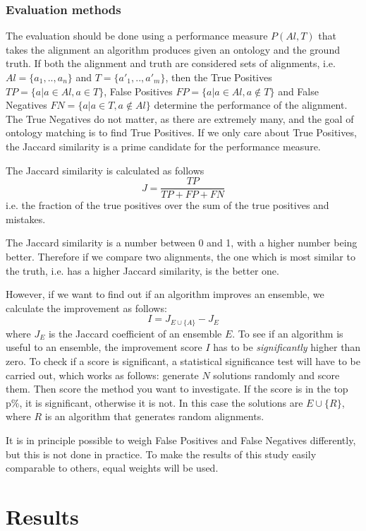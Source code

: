 \documentclass{article}
\begin{document}
 \subsubsection{Evaluation methods} \label{EvaluationMethods}
 The evaluation should be done using a performance measure $P(Al,T)$ that takes the alignment an algorithm produces given an ontology and the ground truth. If both the alignment and truth are considered sets of alignments, i.e. $Al=\{a_1,..,a_n\}$ and $T=\{a'_1,..,a'_m\}$, then the True Positives $TP=\{a|a\in Al, a\in T\}$, False Positives $FP=\{a|a\in Al, a\notin T\}$ and False Negatives $FN=\{a|a\in T, a\notin Al\}$ determine the performance of the alignment. The True Negatives do not matter, as there are extremely many, and the goal of ontology matching is to find True Positives. If we only care about True Positives, the Jaccard similarity is a prime candidate for the performance measure.
 
 The Jaccard similarity is calculated as follows
 \[
 J = \frac{TP}{TP + FP + FN}
 \]
 i.e. the fraction of the true positives over the sum of the true positives and mistakes.
 
 The Jaccard similarity is a number between 0 and 1, with a higher number being better. Therefore if we compare two alignments, the one which is most similar to the truth, i.e. has a higher Jaccard similarity, is the better one.
 
 However, if we want to find out if an algorithm improves an ensemble, we calculate the improvement as follows:
 \[
 I = J_{E\cup \{A\}} - J_E
 \]
 where $J_E$ is the Jaccard coefficient of an ensemble $E$.
 To see if an algorithm is useful to an ensemble, the improvement score $I$ has to be \emph{significantly} higher than zero. To check if a score is significant, a statistical significance test will have to be carried out, which works as follows: generate $N$ solutions randomly and score them. Then score the method you want to investigate. If the score is in the top p\%, it is significant, otherwise it is not. In this case the solutions are $E\cup \{R\}$, where $R$ is an algorithm that generates random alignments\cite{fisher1925statistical}.
 
 It is in principle possible to weigh False Positives and False Negatives differently, but this is not done in practice. To make the results of this study easily comparable to others, equal weights will be used.
 
 \newpage
 \section{Results} \label{results}
 
\end{document}
